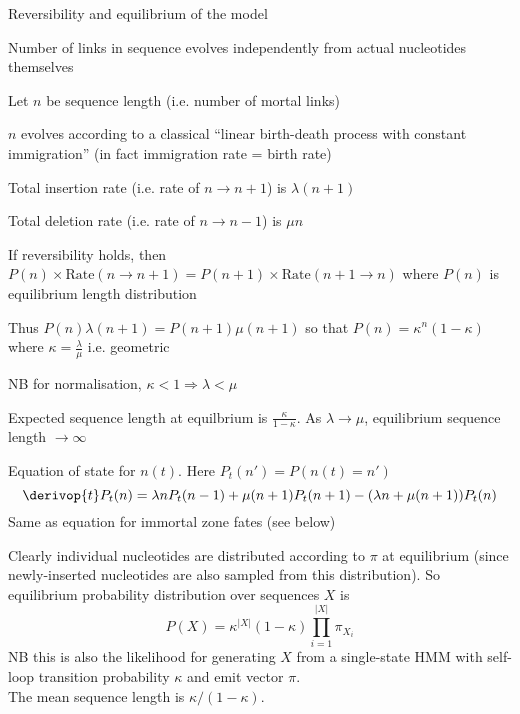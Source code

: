 \documentclass{beamer}
\begin{document}
\begin{frame}{}
\itemb
\item Reversibility and equilibrium of the model
 \itemb
 \item Number of links in sequence evolves independently from actual nucleotides themselves
 \item Let $n$ be sequence length (i.e. number of mortal links)
  \itemb
  \item $n$ evolves according to a classical ``linear birth-death process with constant immigration'' (in fact immigration rate = birth rate)
  \item Total insertion rate (i.e. rate of $n \to n+1$) is $\lambda (n+1)$
  \item Total deletion rate (i.e. rate of $n \to n-1$) is $\mu n$
  \item If reversibility holds, then $P(n) \times \mbox{Rate}(n \to n+1) = P(n+1) \times \mbox{Rate}(n+1 \to n)$ where $P(n)$ is equilibrium length distribution
  \item Thus $P(n) \lambda(n+1) = P(n+1) \mu(n+1)$ so that $P(n) = \kappa^n (1-\kappa)$ where $\kappa = \frac{\lambda}{\mu}$ i.e. geometric
  \item NB for normalisation, $\kappa < 1 \Rightarrow \lambda < \mu$
  \item Expected sequence length at equilbrium is $\frac{\kappa}{1-\kappa}$. As $\lambda \to \mu$, equilibrium sequence length $\to \infty$
  \iteme
 \iteme
\iteme
\end{frame}

\begin{frame}{}
\itemb
\item Equation of state for $n(t)$. Here $P_t(n') = P(n(t)=n')$
\[
\derivop{t} P_t(n) = \lambda n P_t(n-1) + \mu (n+1) P_t(n+1) - (\lambda n + \mu (n+1)) P_t(n)
\]
Same as equation for immortal zone fates (see below)
\item Clearly individual nucleotides are distributed according to $\pi$ at equilibrium
(since newly-inserted nucleotides are also sampled from this distribution).
So equilibrium probability distribution over sequences $X$ is
\[
P(X) = \kappa^{|X|} (1-\kappa) \prod_{i=1}^{|X|} \pi_{X_i}
\]
NB this is also the likelihood for generating $X$ from a single-state HMM with self-loop transition probability $\kappa$ and emit vector $\pi$.
\\
The mean sequence length is $\kappa/(1-\kappa)$. %
\iteme
\end{frame}
\end{document}
